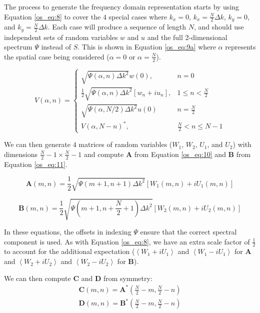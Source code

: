 The process to generate the frequency domain representation starts by using Equation \ref{os_eq:8} to cover the $4$ special cases where $k_x = 0$, $k_x = \frac{N}{2}\Delta k$, $k_y = 0$, and $k_y = \frac{N}{2}\Delta k$. Each case will produce a sequence of length $N$, and should use independent sets of random variables $w$ and $u$ and the full 2-dimensional spectrum $\Psi$ instead of $S$. This is shown in Equation \ref{os_eq:9a} where $\alpha$ represents the spatial case being considered ($\alpha = 0$ or $\alpha = \frac{N}{2}$).

\begin{equation}
  \label{os_eq:9a}   
  V(\alpha,n) = \begin{cases}
    \sqrt{\Psi(\alpha,n)\Delta k^2}w(0), & n = 0 \\
    \frac{1}{2}\sqrt{\Psi(\alpha,n)\Delta k^2}\left[w_n + iu_n \right], & 1 \leq n < \frac{N}{2} \\
   \sqrt{\Psi(\alpha,N/2)\Delta k^2}u(0) & n = \frac{N}{2} \\
    V(\alpha,N-n)^*, &  \frac{N}{2} < n \leq N-1 
  \end{cases} 
\end{equation}

We can then generate $4$ matrices of random variables ($W_1$, $W_2$, $U_1$, and $U_2$) with dimensions $\frac{N}{2} - 1 \times \frac{N}{2} - 1$ and compute $\mathbf{A}$ from Equation \ref{os_eq:10} and $\mathbf{B}$ from Equation \ref{os_eq:11}.

\begin{equation}
\label{os_eq:10}
\mathbf{A}(m,n) = \frac{1}{2}\sqrt{\Psi(m+1,n+1)\Delta k^2}\left[W_1(m,n) + iU_1(m,n) \right]
\end{equation}

\begin{equation}
\label{os_eq:11}
\mathbf{B}(m,n) = \frac{1}{2}\sqrt{\Psi(m+ 1,n+\frac{N}{2} +1)\Delta k^2}\left[W_2(m,n) + iU_2(m,n) \right]
\end{equation}

In these equations, the offsets in indexing $\Psi$ ensure that the correct spectral component is used. As with Equation \ref{os_eq:8}, we have an extra scale factor of $\frac{1}{2}$ to account for the additional expectation ($\left<W_1 + iU_1\right>$ and $\left<W_1 - iU_1\right>$ for $\mathbf{A}$ and $\left<W_2 + iU_2\right>$ and $\left<W_2 - iU_2\right>$ for $\mathbf{B}$).

We can then compute $\mathbf{C}$ and $\mathbf{D}$ from symmetry:
\begin{equation}
\label{os_eq:12}
\begin{gathered}
\mathbf{C}(m,n) = \mathbf{A}^*\left(\frac{N}{2} - m, \frac{N}{2} - n \right) \\
\mathbf{D}(m,n) = \mathbf{B}^*\left(\frac{N}{2} - m, \frac{N}{2} - n \right) \\
\end{gathered}
\end{equation}

